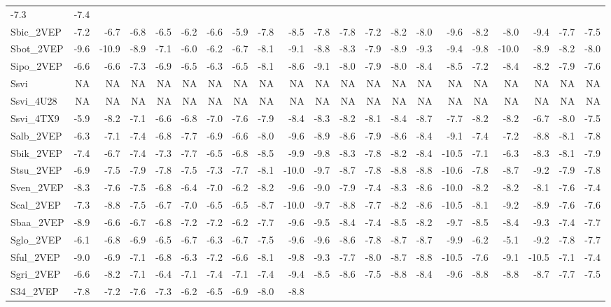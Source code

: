 \documentclass[12pt,twoside]{reedthesis}
\begin{document}
\begin{longtable}[]{@{}lrrrrrrrrrrrrrrrrrrrr@{}}
  -7.3 & -7.4\tabularnewline
  Sbic\_2VEP & -7.2 & -6.7 & -6.8 & -6.5 & -6.2 & -6.6 & -5.9 & -7.8 &
  -8.5 & -7.8 & -7.8 & -7.2 & -8.2 & -8.0 & -9.6 & -8.2 & -8.0 & -9.4 &
  -7.7 & -7.5\tabularnewline
  Sbot\_2VEP & -9.6 & -10.9 & -8.9 & -7.1 & -6.0 & -6.2 & -6.7 & -8.1 &
  -9.1 & -8.8 & -8.3 & -7.9 & -8.9 & -9.3 & -9.4 & -9.8 & -10.0 & -8.9 &
  -8.2 & -8.0\tabularnewline
  Sipo\_2VEP & -6.6 & -6.6 & -7.3 & -6.9 & -6.5 & -6.3 & -6.5 & -8.1 &
  -8.6 & -9.1 & -8.0 & -7.9 & -8.0 & -8.4 & -8.5 & -7.2 & -8.4 & -8.2 &
  -7.9 & -7.6\tabularnewline
  Ssvi & NA & NA & NA & NA & NA & NA & NA & NA & NA & NA & NA & NA & NA &
  NA & NA & NA & NA & NA & NA & NA\tabularnewline
  Ssvi\_4U28 & NA & NA & NA & NA & NA & NA & NA & NA & NA & NA & NA & NA &
  NA & NA & NA & NA & NA & NA & NA & NA\tabularnewline
  Ssvi\_4TX9 & -5.9 & -8.2 & -7.1 & -6.6 & -6.8 & -7.0 & -7.6 & -7.9 &
  -8.4 & -8.3 & -8.2 & -8.1 & -8.4 & -8.7 & -7.7 & -8.2 & -8.2 & -6.7 &
  -8.0 & -7.5\tabularnewline
  Salb\_2VEP & -6.3 & -7.1 & -7.4 & -6.8 & -7.7 & -6.9 & -6.6 & -8.0 &
  -9.6 & -8.9 & -8.6 & -7.9 & -8.6 & -8.4 & -9.1 & -7.4 & -7.2 & -8.8 &
  -8.1 & -7.8\tabularnewline
  Sbik\_2VEP & -7.4 & -6.7 & -7.4 & -7.3 & -7.7 & -6.5 & -6.8 & -8.5 &
  -9.9 & -9.8 & -8.3 & -7.8 & -8.2 & -8.4 & -10.5 & -7.1 & -6.3 & -8.3 &
  -8.1 & -7.9\tabularnewline
  Stsu\_2VEP & -6.9 & -7.5 & -7.9 & -7.8 & -7.5 & -7.3 & -7.7 & -8.1 &
  -10.0 & -9.7 & -8.7 & -7.8 & -8.8 & -8.8 & -10.6 & -7.8 & -8.7 & -9.2 &
  -7.9 & -7.8\tabularnewline
  Sven\_2VEP & -8.3 & -7.6 & -7.5 & -6.8 & -6.4 & -7.0 & -6.2 & -8.2 &
  -9.6 & -9.0 & -7.9 & -7.4 & -8.3 & -8.6 & -10.0 & -8.2 & -8.2 & -8.1 &
  -7.6 & -7.4\tabularnewline
  Scal\_2VEP & -7.3 & -8.8 & -7.5 & -6.7 & -7.0 & -6.5 & -6.5 & -8.7 &
  -10.0 & -9.7 & -8.8 & -7.7 & -8.2 & -8.6 & -10.5 & -8.1 & -9.2 & -8.9 &
  -7.6 & -7.6\tabularnewline
  Sbaa\_2VEP & -8.9 & -6.6 & -6.7 & -6.8 & -7.2 & -7.2 & -6.2 & -7.7 &
  -9.6 & -9.5 & -8.4 & -7.4 & -8.5 & -8.2 & -9.7 & -8.5 & -8.4 & -9.3 &
  -7.4 & -7.7\tabularnewline
  Sglo\_2VEP & -6.1 & -6.8 & -6.9 & -6.5 & -6.7 & -6.3 & -6.7 & -7.5 &
  -9.6 & -9.6 & -8.6 & -7.8 & -8.7 & -8.7 & -9.9 & -6.2 & -5.1 & -9.2 &
  -7.8 & -7.7\tabularnewline
  Sful\_2VEP & -9.0 & -6.9 & -7.1 & -6.8 & -6.3 & -7.2 & -6.6 & -8.1 &
  -9.8 & -9.3 & -7.7 & -8.0 & -8.7 & -8.8 & -10.5 & -7.6 & -9.1 & -10.5 &
  -7.1 & -7.4\tabularnewline
  Sgri\_2VEP & -6.6 & -8.2 & -7.1 & -6.4 & -7.1 & -7.4 & -7.1 & -7.4 &
  -9.4 & -8.5 & -8.6 & -7.5 & -8.8 & -8.4 & -9.6 & -8.8 & -8.8 & -8.7 &
  -7.7 & -7.5\tabularnewline
  S34\_2VEP & -7.8 & -7.2 & -7.6 & -7.3 & -6.2 & -6.5 & -6.9 & -8.0 & -8.8

\end{longtable}
\end{document}
